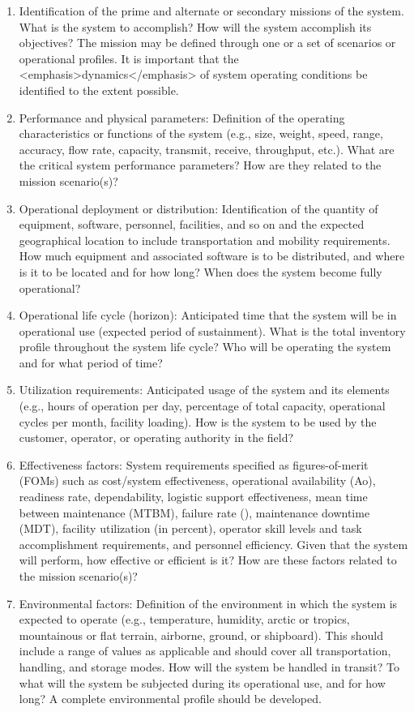 \begin{enumerate}
\item Identification of the prime and alternate or secondary missions of the system. What is the system to accomplish? How will the system accomplish its objectives? The mission may be defined through one or a set of scenarios or operational profiles. It is important that the <emphasis>dynamics</emphasis> of system operating conditions be identified to the extent possible.
\item Performance and physical parameters: Definition of the operating characteristics or functions of the system (e.g., size, weight, speed, range, accuracy, flow rate, capacity, transmit, receive, throughput, etc.). What are the critical system performance parameters? How are they related to the mission scenario(s)?
\item Operational deployment or distribution: Identification of the quantity of equipment, software, personnel, facilities, and so on and the expected geographical location to include transportation and mobility requirements. How much equipment and associated software is to be distributed, and where is it to be located and for how long? When does the system become fully operational?
\item Operational life cycle (horizon): Anticipated time that the system will be in operational use (expected period of sustainment). What is the total inventory profile throughout the system life cycle? Who will be operating the system and for what period of time?
\item Utilization requirements: Anticipated usage of the system and its elements (e.g., hours of operation per day, percentage of total capacity, operational cycles per month, facility loading). How is the system to be used by the customer, operator, or operating authority in the field?
\item Effectiveness factors: System requirements specified as figures-of-merit (FOMs) such as cost/system effectiveness, operational availability (Ao), readiness rate, dependability, logistic support effectiveness, mean time between maintenance (MTBM), failure rate (), maintenance downtime (MDT), facility utilization (in percent), operator skill levels and task accomplishment requirements, and personnel efficiency. Given that the system will perform, how effective or efficient is it? How are these factors related to the mission scenario(s)?
\item Environmental factors: Definition of the environment in which the system is expected to operate (e.g., temperature, humidity, arctic or tropics, mountainous or flat terrain, airborne, ground, or shipboard). This should include a range of values as applicable and should cover all transportation, handling, and storage modes. How will the system be handled in transit? To what will the system be subjected during its operational use, and for how long? A complete environmental profile should be developed.
\end{enumerate}

